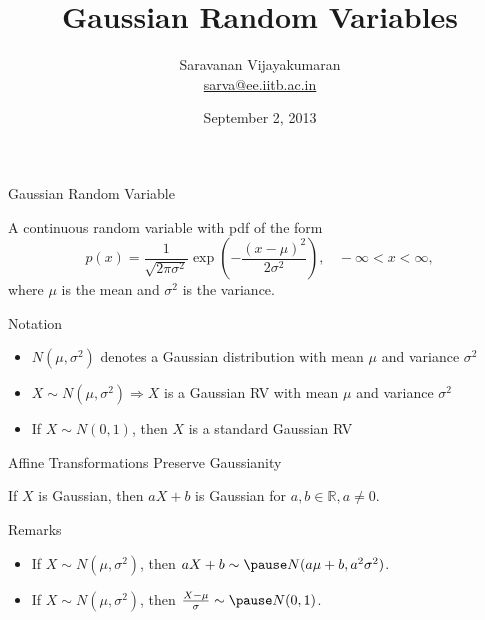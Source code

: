 \documentclass[t]{beamer}
\title[EE 703 DMT]{Gaussian Random Variables}
\author[Saravanan V]
{
  Saravanan Vijayakumaran\\
  \href{mailto:sarva@ee.iitb.ac.in}{sarva@ee.iitb.ac.in}
}
\institute[IIT Bombay]
{
  Department of Electrical Engineering\\
  Indian Institute of Technology Bombay
}
\date{September 2, 2013}
\begin{document}
\begin{frame}
  \titlepage
\end{frame}

\begin{frame}{Gaussian Random Variable}
  \footnotesize
  \begin{definition}[]
    \pause
    A continuous random variable with pdf of the form
    \begin{equation*}
    p(x) = \frac{1}{\sqrt{2\pi \sigma^2}} \exp{\left(-\frac{(x-\mu)^2}{2\sigma^2}\right)}, \ \ \ \ -\infty < x < \infty,
    \end{equation*}
    where $\mu$ is the mean and $\sigma^2$ is the variance.
  \end{definition}
  \pause
         \begin{figure}
          \centering
      \end{figure}
  \normalsize
\end{frame}

\begin{frame}{Notation}
  \footnotesize
  \begin{itemize}
    \item $N(\mu,\sigma^2)$ denotes a Gaussian distribution with mean $\mu$ and variance $\sigma^2$
    \pause
    \item $X \sim N(\mu,\sigma^2) \Rightarrow X$ is a Gaussian RV with mean $\mu$ and variance $\sigma^2$
    \pause
    \item If $X \sim N(0,1)$, then $X$ is a standard Gaussian RV
  \end{itemize}
  \normalsize
\end{frame}

\begin{frame}{Affine Transformations Preserve Gaussianity}
  \footnotesize
  \pause
  \begin{theorem}[]
    If $X$ is Gaussian, then $aX+b$ is Gaussian \pause for $a, b \in \mathbb{R}, a \neq 0$.
  \end{theorem}
  \pause
  \begin{block}{Remarks}
  \begin{itemize}
    \item If $X \sim N(\mu,\sigma^2)$, then $aX+b \sim \pause N(a\mu+b, a^2\sigma^2)$. 
    \pause
    \item If $X \sim N(\mu,\sigma^2)$, then $\frac{X-\mu}{\sigma} \sim \pause N(0,1)$.
  \end{itemize}
  \end{block}
  \normalsize
\end{frame}
\end{document}
